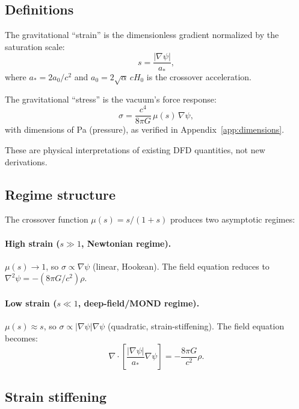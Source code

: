 \documentclass[aps,prd,twocolumn,superscriptaddress,nofootinbib]{revtex4-2}
\begin{document}
\subsection{Definitions}

The gravitational ``strain'' is the dimensionless gradient normalized
by the saturation scale:
\begin{equation}
s = \frac{|\nabla\psi|}{a_*},
\label{eq:strain}
\end{equation}
where $a_* = 2a_0/c^2$ and $a_0 = 2\sqrt{\alpha}\,cH_0$ is the
crossover acceleration.

The gravitational ``stress'' is the vacuum's force response:
\begin{equation}
\sigma = \frac{c^4}{8\pi G}\,\mu(s)\,\nabla\psi,
\label{eq:stress}
\end{equation}
with dimensions of Pa (pressure), as verified in
Appendix~\ref{app:dimensions}.

These are physical interpretations of existing DFD quantities, not new
derivations.

\subsection{Regime structure}

The crossover function $\mu(s) = s/(1+s)$ produces two asymptotic
regimes:

\paragraph{High strain ($s \gg 1$, Newtonian regime).}
$\mu(s) \to 1$, so $\sigma \propto \nabla\psi$ (linear, Hookean).
The field equation reduces to $\nabla^2\psi = -(8\pi G/c^2)\rho$.

\paragraph{Low strain ($s \ll 1$, deep-field/MOND regime).}
$\mu(s) \approx s$, so $\sigma \propto |\nabla\psi|\nabla\psi$
(quadratic, strain-stiffening).  The field equation becomes:
\begin{equation}
\nabla\cdot\left[\frac{|\nabla\psi|}{a_*}\nabla\psi\right]
= -\frac{8\pi G}{c^2}\rho.
\end{equation}

\subsection{Strain stiffening}
\end{document}
